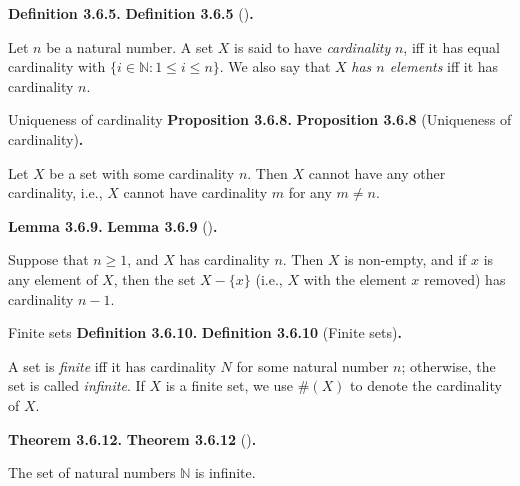 \documentclass[12pt]{article}
\newenvironment{df}[2][\relax]{
\vspace{4mm}
    \noindent\setlength{\parskip}{1em}%
    \ifx#1\relax%
        \textbf{#2. }%
    \else%
        \textbf{#2} (#1)\textbf{. }%
    \fi%
    \ignorespaces%
}{}
\theoremstyle{remark}
\begin{document}
\begin{df}{Definition 3.6.5}
    Let $n$ be a natural number.
    A set $X$ is said to have \emph{cardinality} $n$, iff it has equal cardinality with $\{ i \in \mathbb{N} : 1 \le i \le n \}$.
    We also say that $X$ \emph{has $n$ elements} iff it has cardinality $n$.
\end{df}


\begin{df}[Uniqueness of cardinality]{Proposition 3.6.8}
    Let $X$ be a set with some cardinality $n$.
    Then $X$ cannot have any other cardinality, i.e., $X$ cannot have cardinality $m$ for any $m \ne n$.
\end{df}


\begin{df}{Lemma 3.6.9}
    Suppose that $n \ge 1$, and $X$ has cardinality $n$.
    Then $X$ is non-empty, and if $x$ is any element of $X$, then the set $X - \{ x \}$ (i.e., $X$ with the element $x$ removed) has cardinality $n - 1$.
\end{df}


\begin{df}[Finite sets]{Definition 3.6.10}
    A set is \emph{finite} iff it has cardinality $N$ for some natural number $n$; otherwise, the set is called \emph{infinite}.
    If $X$ is a finite set, we use $\#(X)$ to denote the cardinality of $X$.
\end{df}


\begin{df}{Theorem 3.6.12}
    The set of natural numbers $\mathbb{N}$ is infinite.
\end{df}
\end{document}
